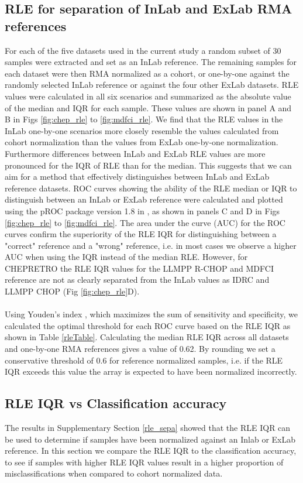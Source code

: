 \documentclass{article}
\begin{document}
\subsection*{RLE for separation of InLab and ExLab RMA references} \label{rle_sepa}
For each of the five datasets used in the current study a random subset of 30 samples were extracted and set as an InLab reference. The remaining samples for each dataset were then RMA normalized as a cohort, or one-by-one against the randomly selected InLab reference or against the four other ExLab datasets. RLE values were calculated in all six scenarios and summarized as the absolute value of the median and IQR for each sample. These values are shown in panel A and B in Figs \ref{fig:chep_rle} to  \ref{fig:mdfci_rle}. We find that the RLE values in the InLab one-by-one scenarios more closely resemble the values calculated from cohort normalization than the values from ExLab one-by-one normalization. Furthermore differences between InLab and ExLab RLE values are more pronounced for the IQR of RLE than for the median. This suggests that we can aim for a method that effectively distinguishes between InLab and ExLab reference datasets. ROC curves showing the ability of the RLE median or IQR to distinguish between an InLab or ExLab reference were calculated and plotted using the pROC package version 1.8 \citep{Robin2011} in \R, as shown in panels C and D in Figs \ref{fig:chep_rle} to \ref{fig:mdfci_rle}. The area under the curve (AUC) for the ROC curves confirm the superiority of the RLE IQR for distinguishing between a "correct" reference and a "wrong" reference, i.e. in most cases we observe a higher AUC when using the IQR instead of the median RLE. However, for CHEPRETRO the RLE IQR values for the LLMPP R-CHOP and MDFCI reference are not as clearly separated from the InLab values as IDRC and LLMPP CHOP (Fig \ref{fig:chep_rle}D).\\\\
Using Youden's index \citet{Youden1950}, which maximizes the sum of sensitivity and specificity, we calculated the optimal threshold for each ROC curve based on the RLE IQR as shown in Table \ref{rleTable}. Calculating the median RLE IQR across all datasets and one-by-one RMA references gives a value of 0.62. By rounding we set a conservative threshold of 0.6 for reference normalized samples, i.e. if the RLE IQR exceeds this value the array is expected to have been normalized incorrectly.

\subsection*{RLE IQR vs Classification accuracy}
The results in Supplementary Section \ref{rle_sepa} showed that the RLE IQR can be used to determine if samples have been normalized against an Inlab or ExLab reference. In this section we compare the RLE IQR to the classification accuracy, to see if samples with higher RLE IQR values result in a higher proportion of misclassifications when compared to cohort normalized data. 
\end{document}
